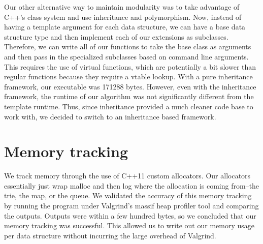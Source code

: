 Our other alternative way to maintain modularity was to take advantage of C++'s class system and use inheritance and polymorphism.
Now, instead of having a template argument for each data structure, we can have a base data structure type and then implement each of our extensions as subclasses.
Therefore, we can write all of our functions to take the base class as arguments and then pass in the specialized subclasses based on command line arguments.
This requires the use of virtual functions, which are potentially a bit slower than regular functions because they require a vtable lookup.
With a pure inheritance framework, our executable was 171288 bytes.
However, even with the inheritance framework, the runtime of our algorithm was not significantly different from the template runtime.
Thus, since inheritance provided a much cleaner code base to work with, we decided to switch to an inheritance based framework.

\section{Memory tracking}
We track memory through the use of C++11 custom allocators.
Our allocators essentially just wrap malloc and then log where the allocation is coming from--the trie, the map, or the queue.
We validated the accuracy of this memory tracking by running the program under Valgrind's massif heap profiler tool and comparing the outputs.
Outputs were within a few hundred bytes, so we concluded that our memory tracking was successful.
This allowed us to write out our memory usage per data structure without incurring the large overhead of Valgrind.